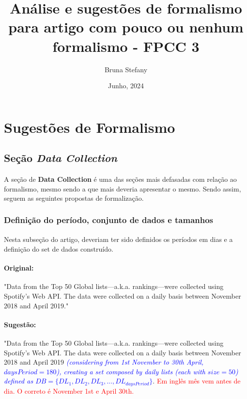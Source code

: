 \documentclass{article}
\title{\textbf{Análise e sugestões de formalismo para artigo com pouco ou nenhum formalismo - FPCC 3}}
\author{Bruna Stefany}
\date{Junho, 2024}
\begin{document}
\maketitle

\section{Sugestões de Formalismo}
\subsection{Seção \textit{Data Collection}}
\paragraph{}
A seção de \textbf{Data Collection} é uma das seções mais defasadas com relação ao formalismo, mesmo sendo a que mais deveria apresentar o mesmo. Sendo assim, seguem as seguintes propostas de formalização.

\subsubsection{Definição do período, conjunto de dados e tamanhos}
\paragraph{}
Nesta subseção do artigo, deveriam ter sido definidos os períodos em dias e a definição do set de dados construído.

\paragraph{Original: }
"Data from the Top 50 Global lists—a.k.a. rankings—were
collected using Spotify’s Web API. The data were collected
on a daily basis between November 2018 and April 2019."

\paragraph{Sugestão: }
"Data from the Top 50 Global lists—a.k.a. rankings—were
collected using Spotify’s Web API. The data were collected
on a daily basis between November 2018 and April 2019 \textcolor{blue} {\textit{(considering from 1st November to 30th April, \(daysPeriod = 180\)), creating a set composed by daily lists (each with \(size = 50\)) defined as \(DB=\{DL_{1},DL_{2},DL_{3},...,DL_{daysPeriod}\}\)}}. \textcolor{red}{Em inglês mês vem antes de dia. O correto é November 1st e April 30th.}
\end{document}

